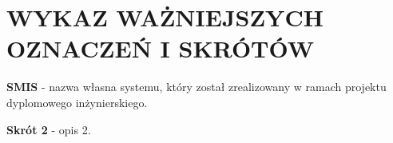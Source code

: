 \chapter*{WYKAZ WAŻNIEJSZYCH OZNACZEŃ I SKRÓTÓW}

\textbf{SMIS} - nazwa własna systemu, który został zrealizowany w ramach projektu dyplomowego inżynierskiego.

\textbf{Skrót 2} - opis 2.

